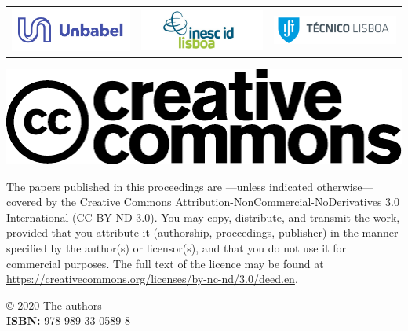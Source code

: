 \documentclass[a4paper,11pt,twoside]{book}
\newcommand{\newoddpage} {\clearpage
  \ifthenelse{\isodd{\value{page}}}{}
  {\thispagestyle{empty}\quad\newpage}}
\begin{document}
\begin{center}
\vspace{1em}
\begin{tabular}{ccc}
\includegraphics[width=0.30\columnwidth]{logos/unbabel-logo.png} & \includegraphics[width=0.30\columnwidth]{logos/inescid-logo.png} & \includegraphics[width=0.30\columnwidth]{logos/ist-logo.png}\\
\end{tabular}
\end{center}

\newoddpage
\thispagestyle{empty}
\vfill \mbox{} \vfill

\noindent \includegraphics[scale=0.5]{logos/creative_commons.pdf} 

\noindent 
The papers published in this proceedings are ---unless indicated
otherwise--- covered by the Creative Commons
Attribution-NonCommercial-NoDerivatives 3.0 International (CC-BY-ND
3.0). You may copy, distribute, and transmit the work, provided that
you attribute it (authorship, proceedings, publisher) in the manner
specified by the author(s) or licensor(s), and that you do not use it
for commercial purposes. The full text of the licence may be found at
\url{https://creativecommons.org/licenses/by-nc-nd/3.0/deed.en}.

\vspace{1cm}

\noindent © 2020 The authors\\
\noindent \textbf{ISBN:} 978-989-33-0589-8\\


\vfill \mbox{}

\end{document}
